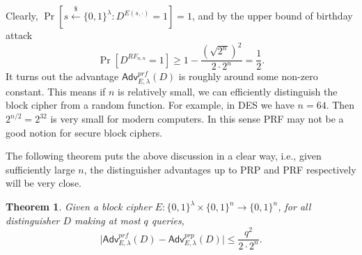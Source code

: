 \documentclass[12pt]{article}
\newcommand{\bits}{\{0,1\}}
\newcommand{\getsr}{\stackrel{\$}{\gets}}
\newcommand{\Adv}{\mathsf{Adv}}
\newtheorem{theorem}{Theorem}[section]
\theoremstyle{definition}
\begin{document}
Clearly, $\Pr[s \getsr \bits^\lambda : D^{E(s, \cdot)} = 1] = 1$, and by the upper bound of birthday attack
$$\Pr[D^{RF_{n,n}}=1] \geq 1-\frac{(\sqrt{2^n})^2}{2\cdot 2^n} = \frac{1}{2}.$$
It turns out the advantage $\Adv_{E,\lambda}^{prf}(D)$ is roughly around some non-zero constant. This means if $n$ is relatively small, we can efficiently distinguish the block cipher from a random function. For example, in DES we have $n=64$. Then $2^{n/2} = 2^{32}$ is very small for modern computers. In this sense PRF may not be a good notion for secure block ciphers.

The following theorem puts the above discussion in a clear way, i.e., given sufficiently large $n$, the distinguisher advantages up to PRP and PRF respectively will be very close.
\begin{theorem}
Given a block cipher $E : \bits^\lambda \times \bits^n \to \bits^n$, for all distinguisher $D$ making at most $q$ queries, 
$$\bigg| \Adv_{E,\lambda}^{prf}(D) - \Adv_{E,\lambda}^{prp}(D) \bigg| \leq \frac{q^2}{2 \cdot 2^n}.$$
\end{theorem}
\end{document}
